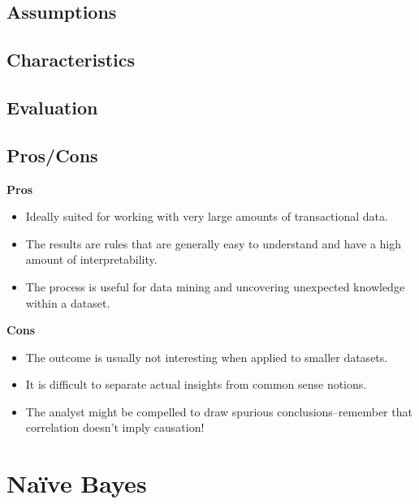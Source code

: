 \documentclass[]{book}
\begin{document}
\hypertarget{assumptions-9}{%
\subsection{Assumptions}\label{assumptions-9}}

\hypertarget{characteristics-8}{%
\subsection{Characteristics}\label{characteristics-8}}

\hypertarget{evaluation-9}{%
\subsection{Evaluation}\label{evaluation-9}}

\hypertarget{proscons-9}{%
\subsection{Pros/Cons}\label{proscons-9}}

\textbf{Pros}

\begin{itemize}
\item
  Ideally suited for working with very large amounts of transactional data.
\item
  The results are rules that are generally easy to understand and have a high amount of interpretability.
\item
  The process is useful for data mining and uncovering unexpected knowledge within a dataset.
\end{itemize}

\textbf{Cons}

\begin{itemize}
\item
  The outcome is usually not interesting when applied to smaller datasets.
\item
  It is difficult to separate actual insights from common sense notions.
\item
  The analyst might be compelled to draw spurious conclusions--remember that correlation doesn't imply causation!
\end{itemize}

\hypertarget{naive-bayes}{%
\section{Naïve Bayes}\label{naive-bayes}}
\end{document}
